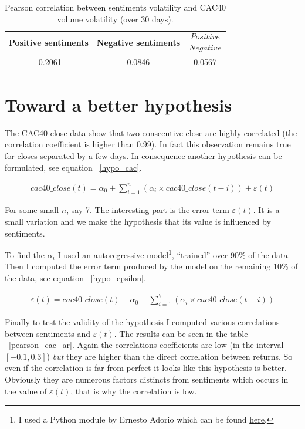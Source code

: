 \documentclass[12pt]{report}
\begin{document}
\begin{table}
	\begin{center}
		\begin{tabular}{|c | c | c|}
			\hline
			Positive sentiments & Negative sentiments & $\dfrac{Positive}{Negative}$\\
			\hline
			-0.2061 & 0.0846 & 0.0567\\
			\hline
		\end{tabular}
	\end{center}

	\caption{Pearson correlation between sentiments volatility and CAC40 volume volatility (over 30 days).\label{pearson_vol_vol}}
\end{table}

\section{Toward a better hypothesis}

The CAC40 close data show that two consecutive close are highly correlated (the correlation coefficient is higher than 0.99). In fact this observation remains true for closes separated by a few days. In consequence another hypothesis can be formulated, see equation ~\ref{hypo_cac}.

\begin{eqnarray}
	cac40\_close(t) = \alpha_0 + \sum_{i = 1}^{n}\left(\alpha_i\times{}cac40\_close(t - i)\right) + \varepsilon(t)\label{hypo_cac}
\end{eqnarray}

For some small $n$, say 7. The interesting part is the error term $\varepsilon(t)$. It is a small variation and we make the hypothesis that its value is influenced by sentiments.

To find the $\alpha_i$ I used an autoregressive model\footnote{I used a Python module by Ernesto Adorio which can be found \href{http://adorio-research.org/wordpress/?p=4551}{here}.}, ``trained'' over 90\% of the data. Then I computed the error term produced by the model on the remaining 10\% of the data, see equation ~\ref{hypo_epsilon}.

\begin{eqnarray}
	\varepsilon(t) = cac40\_close(t) - \alpha_0 - \sum_{i = 1}^{7} \left(\alpha_i\times{}cac40\_close(t - i)\right)\label{hypo_epsilon}
\end{eqnarray}

Finally to test the validity of the hypothesis I computed various correlations between sentiments and $\varepsilon(t)$. The results can be seen in the table ~\ref{pearson_cac_ar}. Again the correlations coefficients are low (in the interval $[-0.1, 0.3]$) \emph{but} they are higher than the direct correlation between returns. So even if the correlation is far from perfect it looks like this hypothesis is better. Obviously they are numerous factors distincts from sentiments which occurs in the value of $\varepsilon(t)$, that is why the correlation is low.
\end{document}
